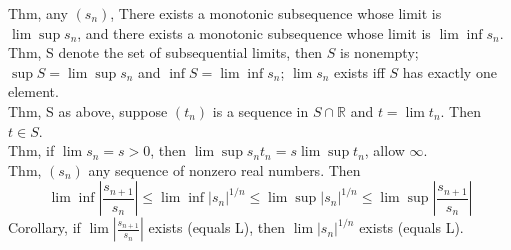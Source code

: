 \documentclass[paper=a4, fontsize=11pt]{scrartcl} %
\numberwithin{equation}{section} %
\numberwithin{figure}{section} %
\numberwithin{table}{section} %
\begin{document}
Thm, any $(s_n)$, There exists a monotonic subsequence whose limit is $\lim\sup s_n$, and there exists a monotonic subsequence whose limit is $\lim\inf s_n$.\\
Thm, S denote the set of subsequential limits, then $S$ is nonempty; $\sup S=\lim\sup s_n$ and $\inf S=\lim\inf s_n$; $\lim s_n$ exists iff $S$ has exactly one element.\\
Thm, S as above, suppose $(t_n)$ is a sequence in $S\cap \mathbb{R}$ and $t=\lim t_n$. Then $t\in S$.\\
Thm, if $\lim s_n=s>0$, then $\lim\sup s_nt_n = s\lim\sup t_n$, allow $\infty$.\\
Thm, $(s_n)$ any sequence of nonzero real numbers. Then
\begin{equation}
\lim\inf|\frac{s_{n+1}}{s_n}| \leq \lim\inf |s_n|^{1/n} \leq \lim\sup |s_n|^{1/n} \leq \lim\sup |\frac{s_{n+1}}{s_n}|
\end{equation}
Corollary, if $\lim |\frac{s_{n+1}}{s_n}|$ exists (equals L), then $\lim|s_n|^{1/n}$ exists (equals L).\\
\end{document}
